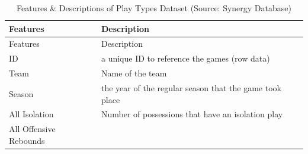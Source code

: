 \documentclass[]{book}
\begin{document}
\begin{longtable}[]{@{}ll@{}}
\caption{\label{tab:play-types} Features \& Descriptions of Play Types Dataset (Source: Synergy Database)}\tabularnewline
\toprule
\begin{minipage}[b]{0.29\columnwidth}\raggedright
Features\strut
\end{minipage} & \begin{minipage}[b]{0.65\columnwidth}\raggedright
Description\strut
\end{minipage}\tabularnewline
\midrule
\endfirsthead
\toprule
\begin{minipage}[b]{0.29\columnwidth}\raggedright
Features\strut
\end{minipage} & \begin{minipage}[b]{0.65\columnwidth}\raggedright
Description\strut
\end{minipage}\tabularnewline
\midrule
\endhead
\begin{minipage}[t]{0.29\columnwidth}\raggedright
ID\strut
\end{minipage} & \begin{minipage}[t]{0.65\columnwidth}\raggedright
a unique ID to reference the games (row data)\strut
\end{minipage}\tabularnewline
\begin{minipage}[t]{0.29\columnwidth}\raggedright
Team\strut
\end{minipage} & \begin{minipage}[t]{0.65\columnwidth}\raggedright
Name of the team\strut
\end{minipage}\tabularnewline
\begin{minipage}[t]{0.29\columnwidth}\raggedright
Season\strut
\end{minipage} & \begin{minipage}[t]{0.65\columnwidth}\raggedright
the year of the regular season that the game took place\strut
\end{minipage}\tabularnewline
\begin{minipage}[t]{0.29\columnwidth}\raggedright
All Isolation\strut
\end{minipage} & \begin{minipage}[t]{0.65\columnwidth}\raggedright
Number of possessions that have an isolation play\strut
\end{minipage}\tabularnewline
\begin{minipage}[t]{0.29\columnwidth}\raggedright
All Offensive Rebounds\strut
\end{minipage} & \begin{minipage}[t]{0.65\columnwidth}\raggedright

\end{minipage}
\end{longtable}
\end{document}
